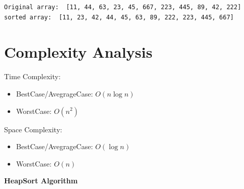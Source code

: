 \documentclass{article}
\begin{document}
{\begin{lstlisting}
Original array:  [11, 44, 63, 23, 45, 667, 223, 445, 89, 42, 222]
sorted array:  [11, 23, 42, 44, 45, 63, 89, 222, 223, 445, 667]
\end{lstlisting}
\section*{Complexity Analysis}
Time Complexity:
\begin{itemize}
    \item BestCase/AvegrageCase: $O(n \log n)$
    \item WorstCase: $O(n^2)$
\end{itemize}
Space Complexity:
\begin{itemize}
    \item BestCase/AvegrageCase: $O( \log n)$
    \item WorstCase: $O(n)$
\end{itemize}
}
\vspace{0.1mm}
\begin{center}
    \LARGE\textbf{HeapSort Algorithm}\end{center}
\end{document}
